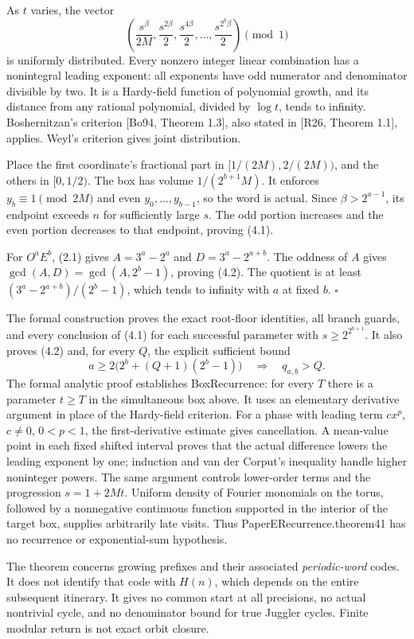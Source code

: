 \documentclass[11pt,a4paper]{article}
\begin{document}
As \(t\) varies, the vector \[
\left(\frac{s^\beta}{2M},\frac{s^{2\beta}}2,
\frac{s^{4\beta}}2,\ldots,\frac{s^{2^b\beta}}2\right)\pmod1
\tag{4.3}
\] is uniformly distributed. Every nonzero integer linear combination
has a nonintegral leading exponent: all exponents have odd numerator and
denominator divisible by two. It is a Hardy-field function of polynomial
growth, and its distance from any rational polynomial, divided by
\(\log t\), tends to infinity. Boshernitzan's criterion {[}Bo94, Theorem
1.3{]}, also stated in {[}R26, Theorem 1.1{]}, applies. Weyl's criterion
gives joint distribution.

Place the first coordinate's fractional part in \([1/(2M),2/(2M))\), and
the others in \([0,1/2)\). The box has volume \(1/(2^{b+1}M)\). It
enforces \(y_b\equiv1\pmod{2M}\) and even \(y_0,\ldots,y_{b-1}\), so the
word is actual. Since \(\beta>2^{a-1}\), its endpoint exceeds \(n\) for
sufficiently large \(s\). The odd portion increases and the even portion
decreases to that endpoint, proving (4.1).

For \(O^aE^b\), (2.1) gives \(A=3^a-2^a\) and \(D=3^a-2^{a+b}\). The
oddness of \(A\) gives \(\gcd(A,D)=\gcd(A,2^b-1)\), proving (4.2). The
quotient is at least \((3^a-2^{a+b})/(2^b-1)\), which tends to infinity
with \(a\) at fixed \(b\). \(\square\)

The formal construction proves the exact root-floor identities, all
branch guards, and every conclusion of (4.1) for each successful
parameter with \(s\ge2^{2^{b+1}}\). It also proves (4.2) and, for every
\(Q\), the explicit sufficient bound \[
a\ge2\bigl(2^b+(Q+1)(2^b-1)\bigr)\quad\Longrightarrow\quad q_{a,b}>Q.
\] The formal analytic proof establishes BoxRecurrence: for every \(T\)
there is a parameter \(t\ge T\) in the simultaneous box above. It uses
an elementary derivative argument in place of the Hardy-field criterion.
For a phase with leading term \(cx^p\), \(c\ne0\), \(0<p<1\), the
first-derivative estimate gives cancellation. A mean-value point in each
fixed shifted interval proves that the actual difference lowers the
leading exponent by one; induction and van der Corput's inequality
handle higher noninteger powers. The same argument controls lower-order
terms and the progression \(s=1+2Mt\). Uniform density of Fourier
monomials on the torus, followed by a nonnegative continuous function
supported in the interior of the target box, supplies arbitrarily late
visits. Thus PaperERecurrence.theorem41 has no recurrence or
exponential-sum hypothesis.

The theorem concerns growing prefixes and their associated
\emph{periodic-word} codes. It does not identify that code with
\(H(n)\), which depends on the entire subsequent itinerary. It gives no
common start at all precisions, no actual nontrivial cycle, and no
denominator bound for true Juggler cycles. Finite modular return is not
exact orbit closure.
\end{document}
